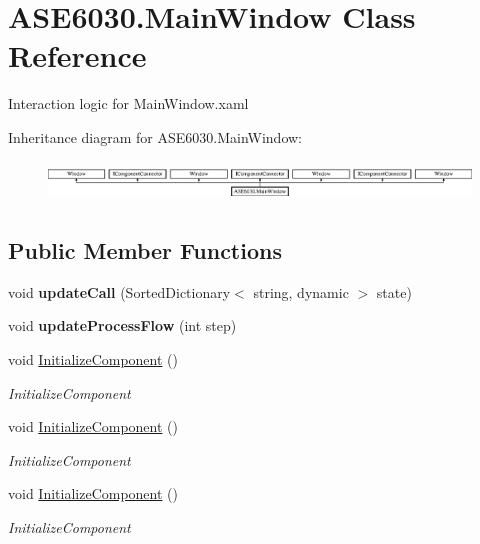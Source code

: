 \hypertarget{class_a_s_e6030_1_1_main_window}{}\section{A\+S\+E6030.\+Main\+Window Class Reference}
\label{class_a_s_e6030_1_1_main_window}


Interaction logic for Main\+Window.\+xaml  


Inheritance diagram for A\+S\+E6030.\+Main\+Window\+:\begin{figure}[H]
\begin{center}
\leavevmode
\includegraphics[height=1.073825cm]{class_a_s_e6030_1_1_main_window}
\end{center}
\end{figure}
\subsection*{Public Member Functions}
\begin{DoxyCompactItemize}
\item 
\mbox{\label{class_a_s_e6030_1_1_main_window_adeaea371e5e8ae0d36da0488e3f573a9}} 
void {\bfseries update\+Call} (Sorted\+Dictionary$<$ string, dynamic $>$ state)
\item 
\mbox{\label{class_a_s_e6030_1_1_main_window_a79b6db853cf517f0df08f041b207e7e6}} 
void {\bfseries update\+Process\+Flow} (int step)
\item 
void \hyperlink{class_a_s_e6030_1_1_main_window_ae87e50858240332fce20264ac23638e8}{Initialize\+Component} ()
\begin{DoxyCompactList}\small\item\em Initialize\+Component \end{DoxyCompactList}\item 
void \hyperlink{class_a_s_e6030_1_1_main_window_ae87e50858240332fce20264ac23638e8}{Initialize\+Component} ()
\begin{DoxyCompactList}\small\item\em Initialize\+Component \end{DoxyCompactList}\item 
void \hyperlink{class_a_s_e6030_1_1_main_window_ae87e50858240332fce20264ac23638e8}{Initialize\+Component} ()
\begin{DoxyCompactList}\small\item\em Initialize\+Component \end{DoxyCompactList}\end{DoxyCompactItemize}
